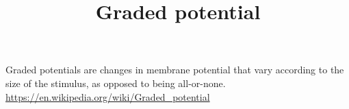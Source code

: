 \documentclass[a4paper]{standalone}
\title{Graded potential}
\begin{document}
    \maketitle
    Graded potentials are changes in membrane potential that vary according to the size of the stimulus, as opposed to being all-or-none.
    \url{https://en.wikipedia.org/wiki/Graded_potential}
\end{document}

